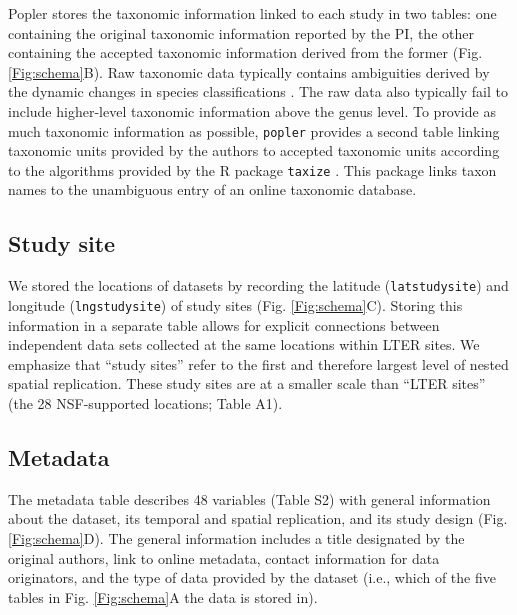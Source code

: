 \documentclass{article}\usepackage[]{graphicx}\usepackage[]{color}
\begin{document}
Popler stores the taxonomic information linked to each study in two tables: one containing the original taxonomic information reported by the PI, the other containing the accepted taxonomic information derived from the former (Fig. \ref{Fig:schema}B). Raw taxonomic data typically contains ambiguities derived by the dynamic changes in species classifications \citep{Chamberlain2013}. The raw data also typically fail to include higher-level taxonomic information above the genus level. To provide as much taxonomic information as possible, \texttt{popler} provides a second table linking taxonomic units provided by the authors to accepted taxonomic units according to the algorithms provided by the R package \texttt{taxize} \citep{Chamberlain2013}. This package links taxon names to the unambiguous entry of an online taxonomic database.

\subsection*{Study site}
We stored the locations of datasets by recording the latitude (\texttt{lat\textunderscore study\textunderscore site}) and longitude (\texttt{lng\textunderscore study\textunderscore site}) of study sites (Fig. \ref{Fig:schema}C). Storing this information in a separate table allows for explicit connections between independent data sets collected at the same locations within LTER sites. We emphasize that ``study sites'' refer to the first and therefore largest level of nested spatial replication. These study sites are at a smaller scale than ``LTER sites'' (the 28 NSF-supported locations; Table A1).

\subsection*{Metadata}
The metadata table describes 48 variables (Table S2) with general information about the dataset, its temporal and spatial replication, and its study design (Fig. \ref{Fig:schema}D). The general information includes a title designated by the original authors, link to online metadata, contact information for data originators, and the type of data provided by the dataset (i.e., which of the five tables in Fig. \ref{Fig:schema}A the data is stored in).
\end{document}
